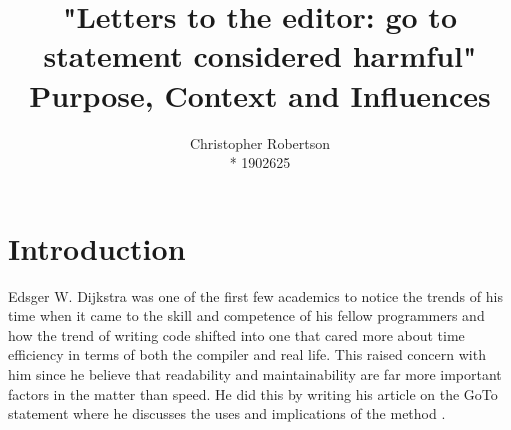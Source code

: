 \documentclass{article}
\title{"Letters to the editor: go to statement considered harmful" Purpose, Context and Influences}
\author{Christopher Robertson \\* 1902625}
\begin{document}
\maketitle
\newpage

\section{Introduction}

Edsger W. Dijkstra was one of the first few academics to notice the trends of his time when it came to the skill and competence of his fellow programmers and how the trend of writing code shifted into one that cared more about time efficiency in terms of both the compiler and real life. This raised concern with him since he believe that readability and maintainability are far more important factors in the matter than speed. He did this by writing his article on the GoTo statement where he discusses the uses and implications of the method \cite{dijkstra1968_goto}.
\end{document}
